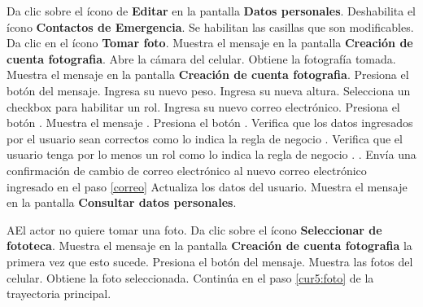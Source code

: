  \begin{UCtrayectoria}
 	
 	\UCpaso [\UCactor] Da clic sobre el ícono de \textbf{Editar} en la pantalla \textbf{Datos personales}.
 	\UCpaso Deshabilita el ícono \textbf{Contactos de Emergencia}.
 	\UCpaso Se habilitan las casillas que son modificables. 	
 	\UCpaso [\UCactor] Da clic en el ícono \textbf{Tomar foto}. 
 	\UCpaso Muestra el mensaje  en la pantalla \textbf{Creación de cuenta fotografia}.
 	\UCpaso Abre la cámara del celular.\label{cur:otrafoto}
 	\UCpaso Obtiene la fotografía tomada.
 	\UCpaso Muestra el mensaje  en la pantalla \textbf{Creación de cuenta fotografia}.
 	\UCpaso [\UCactor] Presiona el botón  del mensaje.
 	\UCpaso [\UCactor] Ingresa su nuevo peso.\label{cur5:foto}
 	\UCpaso [\UCactor] Ingresa su nueva altura.
 	\UCpaso [\UCactor] Selecciona un checkbox para habilitar un rol.   \label{roles}
 	\UCpaso [\UCactor] Ingresa su nuevo correo electrónico.  \label{correo}
 	\UCpaso [\UCactor] Presiona el botón .
 	\UCpaso Muestra el mensaje .
 	\UCpaso [\UCactor] Presiona el botón .
 	\UCpaso Verifica que los datos ingresados por el usuario sean correctos como lo indica la regla de negocio . 
 	\UCpaso Verifica que el usuario tenga por lo menos un rol como lo indica la regla de negocio . .
 	\UCpaso Envía una confirmación de cambio de correo electrónico al nuevo correo electrónico ingresado en el paso \ref{correo}
 	\UCpaso Actualiza los datos del usuario.
 	\UCpaso Muestra el mensaje  en la pantalla \textbf{Consultar datos personales}.
 	
 	 
 	

 \end{UCtrayectoria}

 \begin{UCtrayectoriaA}{A}{El actor no quiere tomar una foto.}
 	\UCpaso [\UCactor] Da clic sobre el ícono \textbf{Seleccionar de fototeca}.
 	\UCpaso Muestra el mensaje  en la pantalla \textbf{Creación de cuenta fotografia} la primera vez que esto sucede.
 	\UCpaso [\UCactor] Presiona el botón  del mensaje.
 	\UCpaso Muestra las fotos del celular.
 	\UCpaso Obtiene la foto seleccionada.
 	\UCpaso Continúa en el paso \ref{cur5:foto} de la trayectoria principal.
 	
 \end{UCtrayectoriaA}


